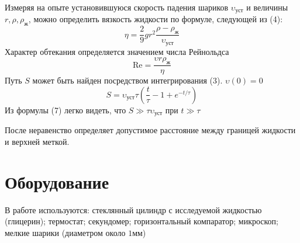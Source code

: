 \documentclass[a4paper,12pt]{article}
\theoremstyle{plain} %
\theoremstyle{definition} %
\theoremstyle{remark} %
\begin{document}
	Измеряя на опыте установившуюся скорость падения шариков $\upsilon_{\text{уст}}$ и величины $r, \rho, \rho_{\text{ж}}$, можно определить вязкость жидкости по формуле, следующей из (4):
	\begin{equation}
	 \eta = \frac{2}{9}gr^2\frac{\rho-\rho_{\text{ж}}}{\upsilon_{\text{уст}}} 
	\end{equation}
	Характер обтекания определяется значением числа Рейнольдса 
	\begin{equation}
	\text{Re} = \frac{\upsilon r \rho_{\text{ж}}}{\eta}
	\end{equation}
	Путь $S$ может быть найден посредством интегрирования (3). $\upsilon(0) = 0$
	\begin{equation}
	S = \upsilon_{\text{уст}}\tau\left(\frac{t}{\tau} - 1 + e^{-t/\tau}\right)
	\end{equation}
	Из формулы (7) легко видеть, что $S\gg\tau\upsilon_{\text{уст}}$ при $t\gg\tau$
	
	После неравенство определяет допустимое расстояние между границей жидкости и верхней меткой.
	\section{Оборудование}
	В работе используются: стеклянный цилиндр с исследуемой жидкостью (глицерин); термостат; секундомер; горизонтальный компаратор; микроскоп; мелкие шарики (диаметром около $1\text{мм}$)
\end{document}
